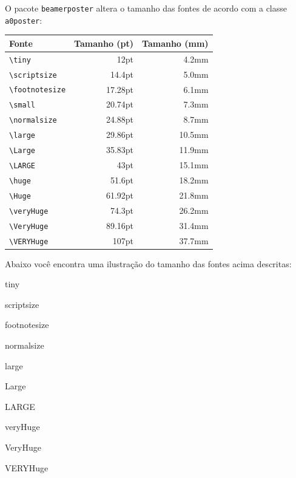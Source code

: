 \documentclass[]{beamer}
\begin{document}
\begin{frame}[t,fragile]
  \begin{columns}[t]
    \begin{column}{0.4\textwidth}
      O pacote \lstinline+beamerposter+ altera o tamanho das fontes de acordo com
      a classe \lstinline+a0poster+:
      \begin{center}
        \begin{tabular}[]{|l|r|r|}
          \hline
          Fonte & Tamanho (pt) & Tamanho (mm) \\ \hline
          \lstinline+\tiny+         & 12pt    & 4.2mm \\ \hline
          \lstinline+\scriptsize+   & 14.4pt  & 5.0mm \\ \hline
          \lstinline+\footnotesize+ & 17.28pt & 6.1mm \\ \hline
          \lstinline+\small+        & 20.74pt & 7.3mm \\ \hline
          \lstinline+\normalsize+   & 24.88pt & 8.7mm \\ \hline
          \lstinline+\large+        & 29.86pt & 10.5mm \\ \hline
          \lstinline+\Large+        & 35.83pt & 11.9mm \\ \hline
          \lstinline+\LARGE+        & 43pt    & 15.1mm \\ \hline
          \lstinline+\huge+         & 51.6pt  & 18.2mm \\ \hline
          \lstinline+\Huge+         & 61.92pt & 21.8mm \\ \hline
          \lstinline+\veryHuge+     & 74.3pt  & 26.2mm \\ \hline
          \lstinline+\VeryHuge+     & 89.16pt & 31.4mm \\ \hline
          \lstinline+\VERYHuge+     & 107pt   & 37.7mm \\ \hline
        \end{tabular}
      \end{center}
      Abaixo você encontra uma ilustração do tamanho das fontes acima descritas:
      \begin{center}
        {\tiny tiny}\par
        {\scriptsize scriptsize}\par
        {\footnotesize footnotesize}\par
        {\normalsize normalsize}\par
        {\large large}\par
        {\Large Large}\par
        {\LARGE LARGE}\par
        {\veryHuge
        veryHuge}\par
        {\VeryHuge
        VeryHuge}\par
        {\VERYHuge
        VERYHuge}\par
      \end{center}


\end{column}
\end{columns}
\end{frame}
\end{document}
